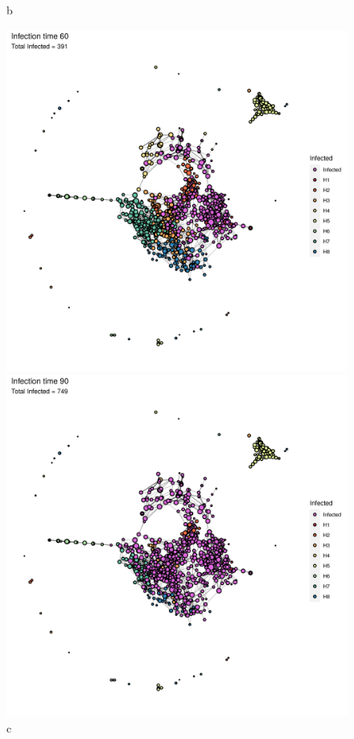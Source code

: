 \begin{figure}[ht]
\begin{minipage}[b]{0.45\linewidth}
        \caption{b}
    \end{minipage}
    \vfill
    \begin{minipage}[b]{0.45\linewidth}
        \includegraphics[width=\linewidth]{figures/Networks/Video/Graph_Infection_60_Infected___manual.png}
        \caption{c}
    \end{minipage}
    \hfill
    \begin{minipage}[b]{0.45\linewidth}
        \includegraphics[width=\linewidth]{figures/Networks/Video/Graph_Infection_90_Infected___manual.png}

\end{minipage}
\end{figure}
